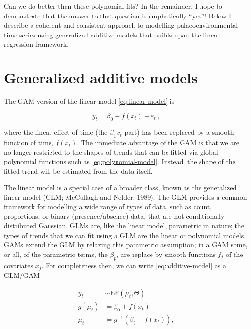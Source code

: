 \documentclass[12pt,]{article}
\begin{document}
Can we do better than these polynomial fits? In the remainder, I hope to
demonstrate that the answer to that question is emphatically ``yes''!
Below I describe a coherent and consistent approach to modelling
palaeoenvironmental time series using generalized additive models that
builds upon the linear regression framework.

\section{Generalized additive models}\label{generalized-additive-models}

The GAM version of the linear model \eqref{eq:linear-model} is

\begin{equation} \label{eq:additive-model}
y_t = \beta_0 + f(x_t) + \varepsilon_t \, ,
\end{equation}

where the linear effect of time (the \(\beta_1 x_t\) part) has been
replaced by a smooth function of time, \(f(x_t)\). The immediate
advantage of the GAM is that we are no longer restricted to the shapes
of trends that can be fitted via global polynomial functions such as
\eqref{eq:polynomial-model}. Instead, the shape of the fitted trend will
be estimated from the data itself.

The linear model is a special case of a broader class, known as the
generalized linear model (GLM; McCullagh and Nelder, 1989). The GLM
provides a common framework for modelling a wide range of types of data,
such as count, proportions, or binary (presence/absence) data, that are
not conditionally distributed Gaussian. GLMs are, like the linear model,
parametric in nature; the types of trends that we can fit using a GLM
are the linear or polynomial models. GAMs extend the GLM by relaxing
this parametric assumption; in a GAM some, or all, of the parametric
terms, the \(\beta_p\), are replace by smooth functions \(f_j\) of the
covariates \(x_j\). For completeness then, we can write
\eqref{eq:additive-model} as a GLM/GAM

\begin{subequations}
\label{eq:gam}
\begin{align}
y_t &\sim \text{EF}(\mu_t, \Theta) \label{eq:gam-ef} \\
g(\mu_t) &= \beta_0 + f(x_t) \label{eq:gam-linear-pred} \\
\mu_t    &= g^{-1}(\beta_0 + f(x_t)), \label{eq:gam-inverse} 
\end{align}
\end{subequations}
\end{document}
